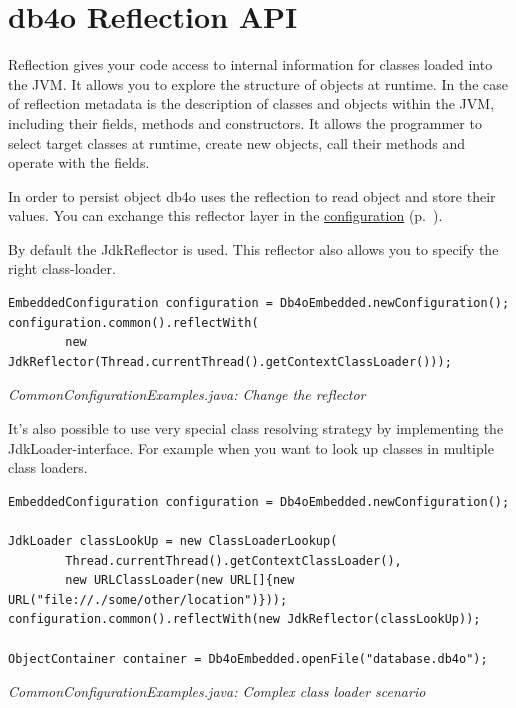\section{db4o Reflection API}
\label{ref:advanced-topics-db4o-reflection-api}

Reflection gives your code access to internal information for classes loaded into the JVM. It allows you to explore the structure of objects at runtime. In the case of reflection metadata is the description of classes and objects within the JVM, including their fields, methods and constructors. It allows the programmer to select target classes at runtime, create new objects, call their methods and operate with the fields.

In order to persist object db4o uses the reflection to read object and store their values. You can exchange this reflector layer in the \hyperref[ref:configuration-common-reflector]{configuration} (p.~\pageref{ref:configuration-common-reflector}).

By default the JdkReflector is used. This reflector also allows you to specify the right class-loader.

\begin{lstlisting}
EmbeddedConfiguration configuration = Db4oEmbedded.newConfiguration();
configuration.common().reflectWith(
        new JdkReflector(Thread.currentThread().getContextClassLoader()));
\end{lstlisting}

{\small\itshape CommonConfigurationExamples.java: Change the reflector\par}
\medskip

It's also possible to use very special class resolving strategy by implementing the JdkLoader-interface. For example when you want to look up classes in multiple class loaders.

\begin{lstlisting}
EmbeddedConfiguration configuration = Db4oEmbedded.newConfiguration();

JdkLoader classLookUp = new ClassLoaderLookup(
        Thread.currentThread().getContextClassLoader(),
        new URLClassLoader(new URL[]{new URL("file://./some/other/location")}));
configuration.common().reflectWith(new JdkReflector(classLookUp));

ObjectContainer container = Db4oEmbedded.openFile("database.db4o");
\end{lstlisting}

{\small\itshape CommonConfigurationExamples.java: Complex class loader scenario\par}
\medskip

